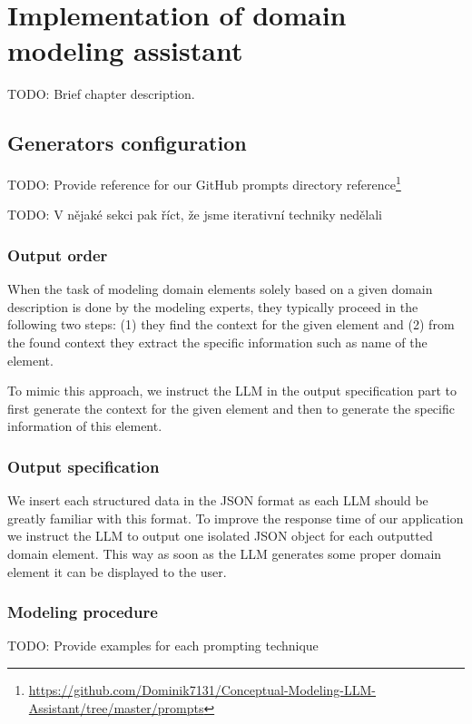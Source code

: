 \chapter{Implementation of domain modeling assistant}

TODO: Brief chapter description.


\section{Generators configuration}

TODO: Provide reference for our GitHub prompts directory reference\footnote{\url{https://github.com/Dominik7131/Conceptual-Modeling-LLM-Assistant/tree/master/prompts}}

TODO: V nějaké sekci pak říct, že jsme iterativní techniky nedělali


\subsection{Output order}
\label{output_order}

When the task of modeling domain elements solely based on a given domain description is done by the modeling experts, they typically proceed in the following two steps: (1) they find the context for the given element and (2) from the found context they extract the specific information such as name of the element.

To mimic this approach, we instruct the LLM in the output specification part to first generate the context for the given element and then to generate the specific information of this element.


\subsection{Output specification}
We insert each structured data in the JSON format as each LLM should be greatly familiar with this format. To improve the response time of our application we instruct the LLM to output one isolated JSON object for each outputted domain element. This way as soon as the LLM generates some proper domain element it can be displayed to the user.


\subsection{Modeling procedure}

TODO: Provide examples for each prompting technique


